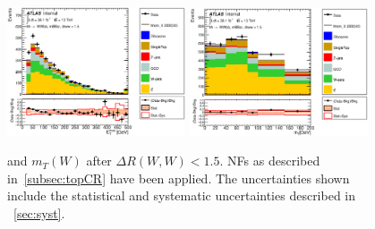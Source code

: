\begin{figure}[!h]
\begin{center}
\includegraphics*[width=0.47\textwidth] {figures/ControlPlots/reOpt2000/C_mBBcr_reOpt2000_bbpt350_wwpt250_drww15_MET_regionA_met25d020}
\includegraphics*[width=0.47\textwidth] {figures/ControlPlots/reOpt2000/C_mBBcr_reOpt2000_bbpt350_wwpt250_drww15_wlepmtben_regionA_met25d020.eps}
\caption[\met and  $m_{T}(W)$ after $\Delta R(W,W) < 1.5$.]{\met and  $m_{T}(W)$ after $\Delta R(W,W) < 1.5$.  \ttbar NFs as described in~\ref{subsec:topCR} have been applied. The uncertainties shown include the statistical and systematic uncertainties described in ~\ref{sec:syst}.}
\end{center}
\end{figure}

